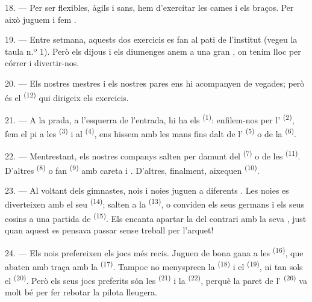 \VUsaut{5.0mm}
\VUsaut{2.4mm}
\VUsaut{3.0mm}

18. --- Per ser flexibles, àgils i sans, hem d'exercitar les cames i els braços. Per això
juguem i fem .

19. --- Entre setmana, aquests dos exercicis es fan al pati de l'institut (vegeu la taula n.º
1). Però els dijous i els diumenges anem a una gran , on tenim lloc per córrer i
divertir-nos.

20. --- Els nostres mestres i els nostres pares ens hi acompanyen de vegades; però és el
 \textsuperscript{(12)} qui dirigeix els exercicis.

21. --- A la prada, a l'esquerra de l'entrada, hi ha els 
\textsuperscript{(1)}: enfilem-nos per l' \textsuperscript{(2)}, fem el pi a
les  \textsuperscript{(3)} i al  \textsuperscript{(4)}, ens
hissem amb les mans fins dalt de l' \textsuperscript{(5)} o de la
 \textsuperscript{(6)}.

22. --- Mentrestant, els nostres companys salten per damunt del 
\textsuperscript{(7)} o de les  \textsuperscript{(11)}. D'altres
 \textsuperscript{(8)} o fan
 \textsuperscript{(9)} amb careta i . D'altres,
finalment, aixequen  \textsuperscript{(10)}.

\VUsaut{4.6mm}
\VUsaut{3.0mm}

23. --- Al voltant dels gimnastes, nois i noies juguen a diferents
. Les noies es diverteixen amb el seu 
\textsuperscript{(14)}; salten a la  \textsuperscript{(13)}, o conviden els seus
germans i els seus cosins a una partida de  \textsuperscript{(15)}. Els
encanta apartar la  del contrari amb la seva , just quan
aquest es pensava passar sense treball per l'arquet!

24. --- Els nois prefereixen els jocs més recis. Juguen de bona gana a les
 \textsuperscript{(16)}, que abaten amb traça amb la
 \textsuperscript{(17)}. Tampoc no menyspreen la 
\textsuperscript{(18)} i el  \textsuperscript{(19)}, ni tan sols el
 \textsuperscript{(20)}. Però els seus jocs preferits són les
 \textsuperscript{(21)} i la  \textsuperscript{(22)},
perquè la paret de l' \textsuperscript{(26)} va molt bé per fer rebotar la
pilota lleugera.

